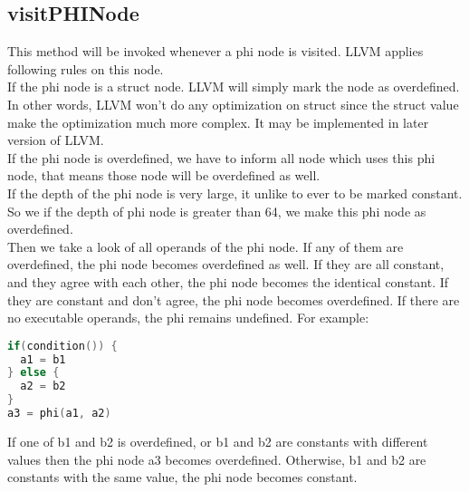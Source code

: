 \subsection{visitPHINode}
This method will be invoked whenever a phi node is visited. LLVM applies following rules on this node. \\
If the phi node is a struct node. LLVM will simply mark the node as overdefined. In other words, LLVM won’t do any optimization on struct since the struct value make the optimization much more complex. It may be implemented in later version of LLVM. \\
If the phi node is overdefined, we have to inform all node which uses this phi node, that means those node will be overdefined as well. \\
If the depth of the phi node is very large, it unlike to ever to be marked constant. So we if the depth of phi node is greater than 64, we make this phi node as overdefined. \\
Then we take a look of all operands of the phi node. If any of them are overdefined, the phi node becomes overdefined as well. If they are all constant, and they agree with each other, the phi node becomes the identical constant. If they are constant and don’t agree, the phi node becomes overdefined. If there are no executable operands, the phi remains undefined. For example:
\begin{lstlisting}[language=c]
if(condition()) {
  a1 = b1
} else {
  a2 = b2
}
a3 = phi(a1, a2)
\end{lstlisting}
If one of b1 and b2 is overdefined, or b1 and b2 are constants with different values then the phi node a3 becomes overdefined. Otherwise, b1 and b2 are constants with the same value, the phi node becomes constant.

